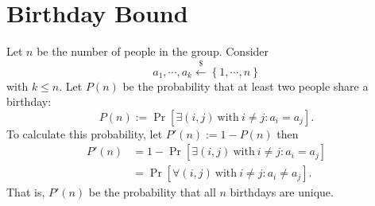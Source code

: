 \documentclass[12pt,openany]{book}
\theoremstyle{definition}
\newcommand{\set}[1]{\left\{#1\right\}}
\newcommand{\of}[1]{\left( #1 \right)}
\newcommand{\dollar}{\$}
\newcommand{\uniform}{\xleftarrow{\dollar}}
\begin{document}
	\section{Birthday Bound}
	Let $n$ be the number of people in the group. Consider \[
	a_1,\cdots,a_k\uniform\set{1,\cdots, n}
	\] with $k\leq n$. Let $P(n)$ be the probability that at least two people share a birthday: \[
	P\of{n}:=\Pr\left[\exists (i,j)\ \text{with}\ i\neq j: a_i=a_j\right].
	\] To calculate this probability, let $P'\of{n}:=1-P\of{n}$ then \begin{align*}
	P'\of{n}&=1-\Pr\left[\exists (i,j)\ \text{with}\ i\neq j: a_i=a_j\right]\\
	&=\Pr\left[\forall(i,j)\ \text{with}\ i\neq j: a_i\neq a_j\right].
	\end{align*}
	That is, $P' (n)$ be the probability that all $n$ birthdays are unique.
	
\end{document}
